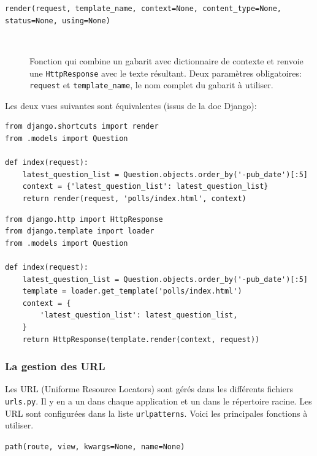 \documentclass[a4paper, 10pt]{article}
\begin{document}
{\begin{description}
    \item[\texttt{render(request, template_name, context=None, content_type=None, status=None, using=None)}]~

    Fonction qui combine un gabarit avec dictionnaire de contexte et renvoie une \texttt{HttpResponse} avec le texte résultant. Deux paramètres obligatoires: \texttt{request} et \texttt{template\_name}, le nom complet du gabarit à utiliser.
\end{description}

Les deux vues suivantes sont équivalentes (issus de la doc
 Django):
\begin{verbatim}
from django.shortcuts import render
from .models import Question

def index(request):
    latest_question_list = Question.objects.order_by('-pub_date')[:5]
    context = {'latest_question_list': latest_question_list}
    return render(request, 'polls/index.html', context)
\end{verbatim}

\begin{verbatim}
from django.http import HttpResponse
from django.template import loader
from .models import Question

def index(request):
    latest_question_list = Question.objects.order_by('-pub_date')[:5]
    template = loader.get_template('polls/index.html')
    context = {
        'latest_question_list': latest_question_list,
    }
    return HttpResponse(template.render(context, request))
\end{verbatim}


\subsubsection{La gestion des URL}
Les URL  (Uniforme Resource Locators) sont gérés dans les différents fichiers \texttt{urls.py}. Il y en a un dans chaque application et un dans le répertoire racine. Les URL sont configurées dans la liste \texttt{urlpatterns}. Voici les principales fonctions à utiliser.

\begin{description}
    \item[\texttt{path(route, view, kwargs=None, name=None)}]~


\end{description}}
\end{document}
